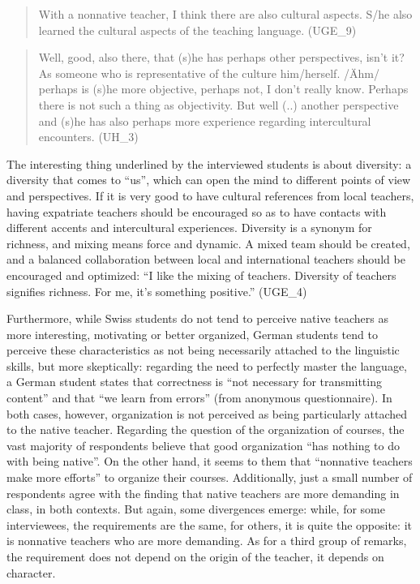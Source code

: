 \documentclass[output=paper]{../langscibook}
\begin{document}
\begin{quote}
With a nonnative teacher, I think there are also cultural aspects. S/he also learned the cultural aspects of the teaching language. (UGE\_9)
\end{quote}

\begin{quote}
Well, good, also there, that (s)he has perhaps other perspectives, isn’t it?  As someone who is representative of the culture him/herself. /Ähm/ perhaps is (s)he more objective, perhaps not, I don’t really know. Perhaps there is not such a thing as objectivity. But well (..) another perspective and (s)he has also perhaps more experience regarding intercultural encounters. (UH\_3)
\end{quote}

The interesting thing underlined by the interviewed students is about diversity: a diversity that comes to “us”, which can open the mind to different points of view and perspectives. If it is very good to have cultural references from local teachers, having expatriate teachers should be encouraged so as to have contacts with different accents and intercultural experiences. Diversity is a synonym for richness, and mixing means force and dynamic. A mixed team should be created, and a balanced collaboration between local and international teachers should be encouraged and optimized: “I like the mixing of teachers. Diversity of teachers signifies richness. For me, it’s something positive.” (UGE\_4) 

Furthermore, while Swiss students do not tend to perceive native teachers as more interesting, motivating or better organized, German students tend to perceive these characteristics as not being necessarily attached to the linguistic skills, but more skeptically: regarding the need to perfectly master the language, a German student states that correctness is “not necessary for transmitting content” and that “we learn from errors” (from anonymous questionnaire).  In both cases, however, organization is not perceived as being particularly attached to the native teacher. Regarding the question of the organization of courses, the vast majority of respondents believe that good organization “has nothing to do with being native”. On the other hand, it seems to them that “nonnative teachers make more efforts” to organize their courses. Additionally, just a small number of respondents agree with the finding that native teachers are more demanding in class, in both contexts. But again, some divergences emerge: while, for some interviewees, the requirements are the same, for others, it is quite the opposite: it is nonnative teachers who are more demanding. As for a third group of remarks, the requirement does not depend on the origin of the teacher, it depends on character.
\end{document}
